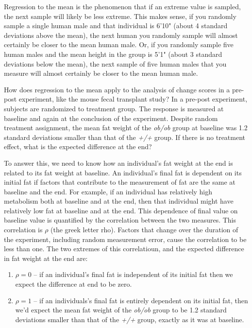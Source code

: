 \documentclass[]{book}
\providecommand{\tightlist}{%
  \setlength{\itemsep}{0pt}\setlength{\parskip}{0pt}}
\begin{document}
Regression to the mean is the phenomenon that if an extreme value is sampled, the next sample will likely be less extreme. This makes sense, if you randomly sample a single human male and that individual is 6'10" (about 4 standard deviations above the mean), the next human you randomly sample will almost certainly be closer to the mean human male. Or, if you randomly sample five human males and the mean height in the group is 5'1" (about 3 standard deviations below the mean), the next sample of five human males that you measure will almost certainly be closer to the mean human male.

How does regression to the mean apply to the analysis of change scores in a pre-post experiment, like the mouse fecal transplant study? In a pre-post experiment, subjects are randomized to treatment group. The response is measured at baseline and again at the conclusion of the experiment. Despite random treatment assignment, the mean fat weight of the \emph{ob/ob} group at baseline was 1.2 standard deviations smaller than that of the \emph{+/+} group. If there is no treatment effect, what is the expected difference at the end?

To answer this, we need to know how an individual's fat weight at the end is related to its fat weight at baseline. An individual's final fat is dependent on its initial fat if factors that contribute to the measurement of fat are the same at baseline and the end. For example, if an individual has relatively high metabolism both at baseline and at the end, then that individual might have relatively low fat at baseline and at the end. This dependence of final value on baseline value is quantified by the correlation between the two measures. This correlation is \(\rho\) (the greek letter rho). Factors that change over the duration of the experiment, including random measurement error, cause the correlation to be less than one. The two extremes of this correlatioun, and the expected difference in fat weight at the end are:

\begin{enumerate}
\def\labelenumi{\arabic{enumi}.}
\tightlist
\item
  \(\rho=0\) -- if an individual's final fat is independent of its initial fat then we expect the difference at end to be zero.
\item
  \(\rho=1\) -- if an individuals's final fat is entirely dependent on its initial fat, then we'd expect the mean fat weight of the \emph{ob/ob} group to be 1.2 standard deviations smaller than that of the \emph{+/+} group, exactly as it was at baseline.
\end{enumerate}
\end{document}
